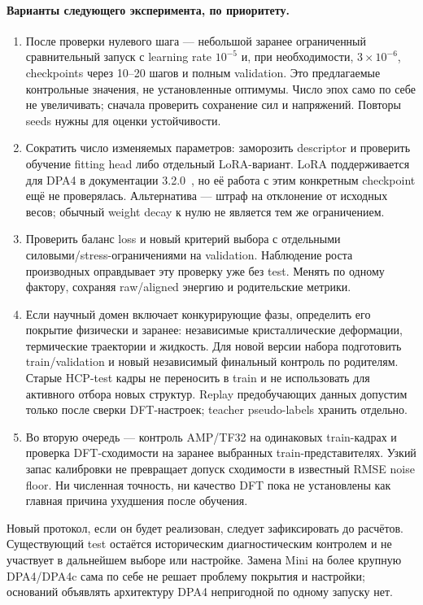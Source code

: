 \documentclass[11pt,a4paper]{article}
\begin{document}
\paragraph{Варианты следующего эксперимента, по приоритету.}
\begin{enumerate}
\item После проверки нулевого шага --- небольшой заранее ограниченный
сравнительный запуск с learning rate $10^{-5}$ и, при необходимости,
$3\times10^{-6}$, checkpoints через 10--20 шагов и полным validation.
Это предлагаемые контрольные значения, не установленные оптимумы.
Число эпох само по себе не увеличивать; сначала проверить сохранение
сил и напряжений. Повторы seeds нужны для оценки устойчивости.
\item Сократить число изменяемых параметров: заморозить descriptor
и проверить обучение fitting head либо отдельный LoRA-вариант.
LoRA поддерживается для DPA4 в документации 3.2.0~\cite{dp-dpa432},
но её работа с этим конкретным checkpoint ещё не проверялась.
Альтернатива --- штраф на отклонение от исходных весов; обычный
weight decay к нулю не является тем же ограничением.
\item Проверить баланс loss и новый критерий выбора с отдельными
силовыми/stress-ограничениями на validation. Наблюдение роста производных
оправдывает эту проверку уже без test. Менять по одному фактору,
сохраняя raw/aligned энергию и родительские метрики.
\item Если научный домен включает конкурирующие фазы, определить его
покрытие физически и заранее: независимые кристаллические деформации,
термические траектории и жидкость. Для новой версии набора подготовить
train/validation и новый независимый финальный контроль по родителям.
Старые HCP-test кадры не переносить в train и не использовать для
активного отбора новых структур. Replay предобучающих данных допустим
только после сверки DFT-настроек; teacher pseudo-labels хранить отдельно.
\item Во вторую очередь --- контроль AMP/TF32 на одинаковых train-кадрах
и проверка DFT-сходимости на заранее выбранных train-представителях.
Узкий запас калибровки не превращает допуск сходимости в известный
RMSE noise floor. Ни численная точность, ни качество DFT пока не
установлены как главная причина ухудшения после обучения.
\end{enumerate}
Новый протокол, если он будет реализован, следует зафиксировать до
расчётов. Существующий test остаётся историческим диагностическим
контролем и не участвует в дальнейшем выборе или настройке.
Замена Mini на более крупную DPA4/DPA4c сама по себе не решает
проблему покрытия и настройки; оснований объявлять архитектуру DPA4
непригодной по одному запуску нет.
\end{document}

